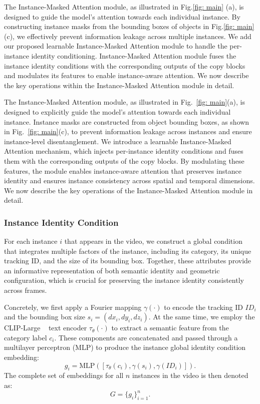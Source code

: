 \documentclass{article} %
\begin{document}
The Instance-Masked Attention module, as illustrated in Fig.\ref{fig: main} (a), is designed to guide the model’s attention towards each individual instance. 
By constructing instance masks from the bounding boxes of objects in Fig.\ref{fig: main} (c), we effectively prevent information leakage across multiple instances. 
We add our proposed learnable Instance-Masked Attention module to handle the per-instance identity conditioning. 
Instance-Masked Attention module fuses the instance identity conditions with the corresponding outputs of the copy blocks 
and modulates its features to enable instance-aware attention.
We now describe the key operations within the Instance-Masked Attention module in detail. 


The Instance-Masked Attention module, as illustrated in Fig.~\ref{fig: main}(a), is designed to explicitly guide the model’s attention towards each individual instance.
Instance masks are constructed from object bounding boxes, as shown in Fig.~\ref{fig: main}(c), to prevent information leakage across instances and ensure instance-level disentanglement.
We introduce a learnable Instance-Masked Attention mechanism, which injects per-instance identity conditions and fuses them with the corresponding outputs of the copy blocks.
By modulating these features, the module enables instance-aware attention that preserves instance identity and ensures instance consistency across spatial and temporal dimensions.
We now describe the key operations of the Instance-Masked Attention module in detail.


\subsubsection{Instance Identity Condition}
For each instance $i$ that appears in the video, we construct a global condition that integrates multiple factors of the instance, including its category, its unique tracking ID, and the size of its bounding box. Together, these attributes provide an informative representation of both semantic identity and geometric configuration, which is crucial for preserving the instance identity consistently across frames.  

Concretely, we first apply a Fourier mapping $\gamma(\cdot)$ to encode the tracking ID $ID_i$ and the bounding box size $s_i=(dx_i,dy_i,dz_i)$. 
At the same time, we employ the CLIP-Large ~\cite{Radford2021LearningTV} text encoder $\tau_\theta(\cdot)$ to extract a semantic feature from the category label $c_i$. These components are concatenated and passed through a multilayer perceptron (MLP) to produce the instance global identity condition embedding:
\begin{equation}
    g_i = \text{MLP}\!\left([\tau_\theta(c_i), \gamma(s_i), \gamma( ID_i)]\right).
\end{equation}
The complete set of embeddings for all $n$ instances in the video is then denoted as:
\[
    G = \{g_i\}_{i=1}^n.
\]
\end{document}
